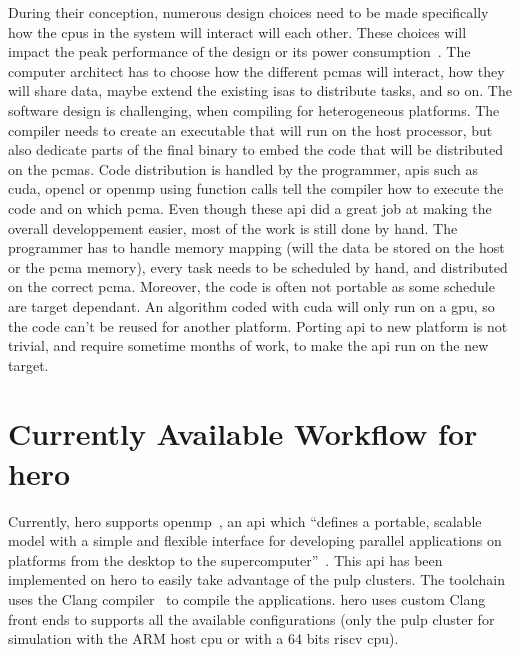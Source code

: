     During their conception, numerous design choices need to be made specifically how the \glspl{cpu} in the system will interact will each other. These choices will impact the peak performance of the design or its power consumption~\cite{Art:Harnessing}. The computer architect has to choose how the different \glspl{pcma} will interact, how they will share data, maybe extend the existing \glspl{isa} to distribute tasks, and so on.
    The software design is challenging, when compiling for heterogeneous platforms. The compiler needs to create an executable that will run on the host processor, but also dedicate parts of the final binary to embed the code that will be distributed on the \glspl{pcma}.
	Code distribution is handled by the programmer, \glspl{api} such as \gls{cuda}, \gls{opencl} or \gls{openmp} using function calls tell the compiler how to execute the code and on which \gls{pcma}. 
	Even though these \gls{api} did a great job at making the overall developpement easier, most of the work is still done by hand. The programmer has to handle memory mapping (will the data be stored on the host or the \gls{pcma} memory), every task needs to be scheduled by hand, and distributed on the correct \gls{pcma}. 
	Moreover, the code is often not portable as some schedule are target dependant. An algorithm coded with \gls{cuda} will only run on a \gls{gpu}, so the code can't be reused for another platform.
	Porting \gls{api} to new platform is not trivial, and require sometime months of work, to make the \gls{api} run on the new target.





\section {Currently Available Workflow for \acrshort{hero}}
    Currently, \gls{hero} supports \gls{openmp}~\cite{Report:SoftwareStack}, an \gls{api} which ``defines a portable, scalable model with a simple and flexible interface for developing parallel applications on platforms from the desktop to the supercomputer''~\cite{Web:OpenMp}. 
	This \gls{api} has been implemented on \gls{hero} to easily take advantage of the \gls{pulp} clusters. The toolchain uses the Clang compiler~\cite{Web:Wikipedia_OpenMP} to compile the applications. \gls{hero} uses custom Clang front ends to supports all the available configurations (only the \gls{pulp} cluster for simulation with the ARM host \gls{cpu} or with a 64 bits \gls{riscv} \gls{cpu}).

